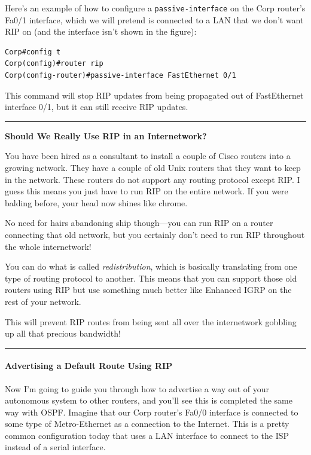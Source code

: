 Here's an example of how to configure a \texttt{passive-interface} on
the Corp router's Fa0/1 interface, which we will pretend is connected to
a LAN that we don't want RIP on (and the interface isn't shown in the
figure):

\begin{verbatim}
Corp#config t
Corp(config)#router rip
Corp(config-router)#passive-interface FastEthernet 0/1
\end{verbatim}

This command will stop RIP updates from being propagated out of
FastEthernet interface 0/1, but it can still receive RIP updates.

\begin{center}\rule{0.5\linewidth}{0.5pt}\end{center}

\textbf{Should We Really Use RIP in an Internetwork?}

You have been hired as a consultant to install a couple of Cisco routers
into a growing network. They have a couple of old Unix routers that they
want to keep in the network. These routers do not support any routing
protocol except RIP. I guess this means you just have to run RIP on the
entire network. If you were balding before, your head now shines like
chrome.

No need for hairs abandoning ship though---you can run RIP on a router
connecting that old network, but you certainly don't need to run RIP
throughout the whole internetwork!

You can do what is called \emph{redistribution}, which is basically
translating from one type of routing protocol to another. This means
that you can support those old routers using RIP but use something much
better like Enhanced IGRP on the rest of your network.

This will prevent RIP routes from being sent all over the internetwork
gobbling up all that precious bandwidth!

\begin{center}\rule{0.5\linewidth}{0.5pt}\end{center}

\paragraph{Advertising a Default Route Using RIP}

Now I'm going to guide you through how to advertise a way out of your
autonomous system to other routers, and you'll see this is completed the
same way with OSPF. Imagine that our Corp router's Fa0/0 interface is
connected to some type of Metro-Ethernet as a connection to the
Internet. This is a pretty common configuration today that uses a LAN
interface to connect to the ISP instead of a serial interface.

